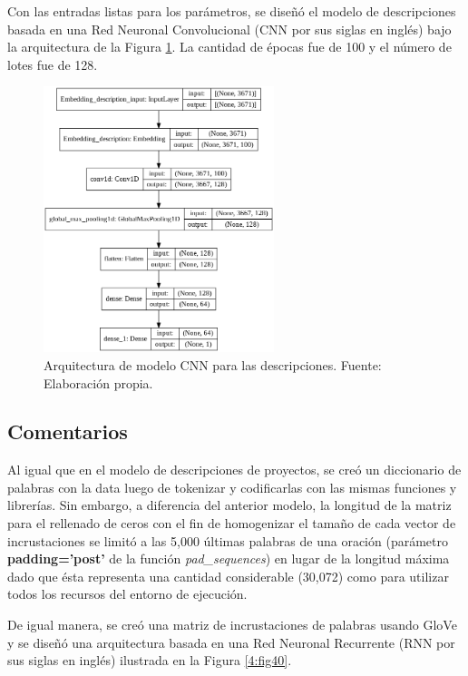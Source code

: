 Con las entradas listas para los parámetros, se diseñó el modelo de descripciones basada en una Red Neuronal Convolucional (CNN por sus siglas en inglés) bajo la arquitectura de la Figura \ref{4:fig39}. La cantidad de épocas fue de 100 y el número de lotes fue de 128.

\begin{figure}[!ht]
	\begin{center}
		\includegraphics[width=0.60\textwidth]{4/figures/model_cnn_description.png}
		\caption{Arquitectura de modelo CNN para las descripciones. Fuente: Elaboración propia.}
		\label{4:fig39}
	\end{center}
\end{figure}

\subsection{Comentarios}
Al igual que en el modelo de descripciones de proyectos, se creó un diccionario de palabras con la data luego de tokenizar y codificarlas con las mismas funciones y librerías. Sin embargo, a diferencia del anterior modelo, la longitud de la matriz para el rellenado de ceros con el fin de homogenizar el tamaño de cada vector de incrustaciones se limitó a las 5,000 últimas palabras de una oración (parámetro \textbf{padding='post'} de la función \textit{pad\_sequences}) en lugar de la longitud máxima dado que ésta representa una cantidad considerable (30,072) como para utilizar todos los recursos del entorno de ejecución.

De igual manera, se creó una matriz de incrustaciones de palabras usando GloVe y se diseñó una arquitectura basada en una Red Neuronal Recurrente (RNN por sus siglas en inglés) ilustrada en la Figura \ref{4:fig40}.

